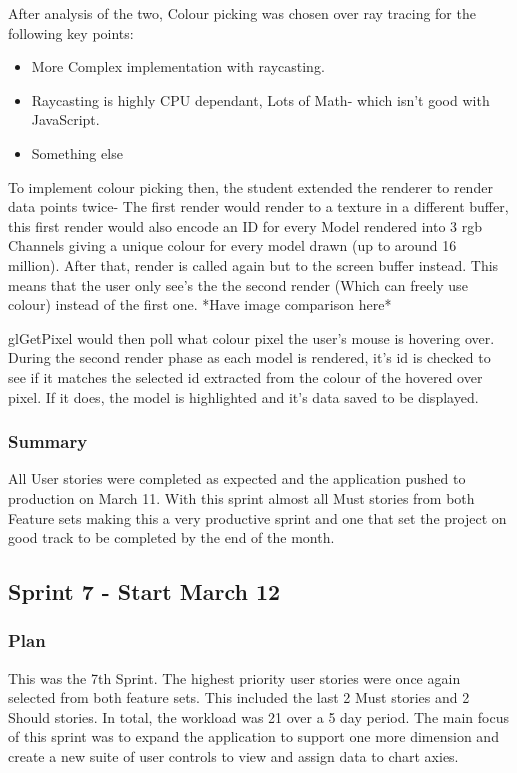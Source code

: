 After analysis of the two, Colour picking was chosen over ray tracing for the following key points:
\begin{itemize}
    \item More Complex implementation with raycasting.
    \item Raycasting is highly CPU dependant, Lots of Math- which isn't good with JavaScript.
    \item Something else
\end{itemize}

To implement colour picking then, the student extended the renderer to render data points twice- The first render would render to a texture in a different buffer, this first render would also encode an ID for every Model rendered into 3 rgb Channels giving a unique colour for every model drawn (up to around 16 million). After that, render is called again but to the screen buffer instead. This means that the user only see's the the second render (Which can freely use colour) instead of the first one.
*Have image comparison here*

glGetPixel would then poll what colour pixel the user's mouse is hovering over. During the second render phase as each model is rendered, it's id is checked to see if it matches the selected id extracted from the colour of the hovered over pixel. If it does, the model is highlighted and it's data saved to be displayed.

\subsubsection{Summary}
All User stories were completed as expected and the application pushed to production on March 11. With this sprint almost all Must stories from both Feature sets making this a very productive sprint and one that set the project on good track to be completed by the end of the month.

\subsection{Sprint 7 - Start March 12}
\subsubsection{Plan}
This was the 7th Sprint. The highest priority user stories were once again selected from both feature sets. This included the last 2 Must stories and 2 Should stories. In total, the workload was 21 over a 5 day period. The main focus of this sprint was to expand the application to support one more dimension and create a new suite of user controls to view and assign data to chart axies.

